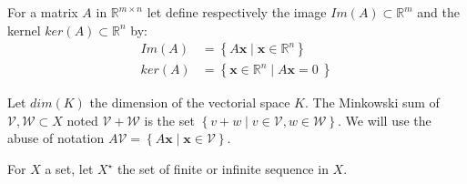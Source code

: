 
For a matrix $A$ in $\mathbb{R}^{m \times n}$ let define respectively the image $Im(A) \subset \mathbb{R}^m$ and the kernel $ker(A) \subset \mathbb{R}^n$ by:
\begin{align*}
Im(A) &= \left \{ A \mathbf{x} \mid \mathbf{x}  \in \mathbb{R}^n \right \} \\ 
ker(A) &= \left \{ \mathbf{x} \in \mathbb{R}^n \mid A \mathbf{x} = 0\ \right \} 
\end{align*}

Let $dim(K)$ the dimension of the vectorial space $K$.
The Minkowski sum of $\mathcal{V},\mathcal{W} \subset X$ noted $\mathcal{V}+\mathcal{W}$ is the set $\left \{v+w \mid v \in \mathcal{V}, w\in \mathcal{W} \right \}$. We will use the abuse of notation $A  \mathcal{V} = \left \{ A \mathbf{x} \mid \mathbf{x}  \in \mathcal{V} \right \}$.

For $X$ a set, let $X^\star$ the set of finite or infinite sequence in $X$.
